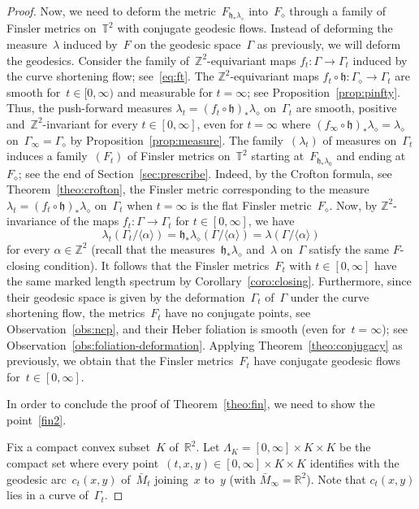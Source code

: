 \documentclass[AHL,Unicode,longabstracts,published]{cedram}
\newcommand{\Z}{\mathbb{Z}}
\newcommand{\R}{\mathbb{R}}
\newcommand{\T}{\mathbb{T}}
\newcommand{\bh}{\mathfrak{h}}
\begin{document}
\begin{proof}
Now, we need to deform the metric~$F_{\bh_* \lambda_\diamond}$ into~$F_\diamond$ through a family of Finsler metrics on~$\T^2$ with conjugate geodesic flows. Instead of deforming the measure~$\lambda$ induced by~$F$ on the geodesic space~$\Gamma$ as previously, we will deform the geodesics. Consider the family of~$\Z^2$-equivariant maps $f_t: \Gamma \to \Gamma_t$ induced by the curve shortening flow; see~\eqref{eq:ft}. The $\Z^2$-equivariant maps $ f_t \circ \bh: \Gamma_\diamond \to \Gamma_t $ are smooth for~$t \in [0,\infty)$ and measurable for $t=\infty$; see Proposition~\ref{prop:pinfty}. Thus, the push-forward measures $\lambda_t=(f_t \circ \bh)_* \lambda_\diamond$ on~$\Gamma_t$ are smooth, positive and~$\Z^2$-invariant for every $t \in [0,\infty]$, even for $t=\infty$ where $(f_\infty \circ \bh)_* \lambda_\diamond = \lambda_\diamond$ on~$\Gamma_\infty = \Gamma_\diamond$ by Proposition~\ref{prop:measure}. The family~$(\lambda_t)$ of measures on~$\Gamma_t$ induces a family~$(F_t)$ of Finsler metrics on~$\T^2$ starting at~$F_{\bh_* \lambda_0}$ and ending at~$F_\diamond$; see the end of Section~\ref{sec:prescribe}. Indeed, by the Crofton formula, see Theorem~\ref{theo:crofton}, the Finsler metric corresponding to the measure~$\lambda_t=(f_t \circ \bh)_* \lambda_\diamond$ on~$\Gamma_t$ when $t=\infty$ is the flat Finsler metric~$F_\diamond$. Now, by $\Z^2$-invariance of the maps $f_t:\Gamma \to \Gamma_t$ for $t \in [0,\infty]$, we have
\[
\lambda_t(\Gamma_t/\langle \alpha \rangle) = \bh_* \lambda_\diamond(\Gamma/\langle \alpha \rangle) = \lambda(\Gamma/\langle \alpha \rangle)
\]
for every $\alpha \in \Z^2$ (recall that the measures~$\bh_* \lambda_\diamond$ and~$\lambda$ on~$\Gamma$ satisfy the same $F$-closing condition). It follows that the Finsler metrics~$F_t$ with $t \in [0,\infty]$ have the same marked length spectrum by Corollary~\ref{coro:closing}. Furthermore, since their geodesic space is given by the deformation~$\Gamma_t$ of~$\Gamma$ under the curve shortening flow, the metrics~$F_t$ have no conjugate points, see Observation~\ref{obs:ncp}, and their Heber foliation is smooth (even for~$t=\infty$); see Observation~\ref{obs:foliation-deformation}. Applying Theorem~\ref{theo:conjugacy} as previously, we obtain that the Finsler metrics~$F_t$ have conjugate geodesic flows for~$t \in [0,\infty]$.


In order to conclude the proof of Theorem~\ref{theo:fin}, we need to show the point~\eqref{fin2}.


Fix a compact convex subset~$K$ of~$\R^2$. Let $\Lambda_K = [0,\infty] \times K \times K$ be the compact set where every point~$(t,x,y) \in [0,\infty] \times K \times K$ identifies with the geodesic arc~$c_t(x,y)$ of~$\bar{M}_t$ joining~$x$ to~$y$ (with $\bar{M}_\infty = \R^2$). Note that $c_t(x,y)$ lies in a curve of~$\Gamma_t$.


\end{proof}
\end{document}
